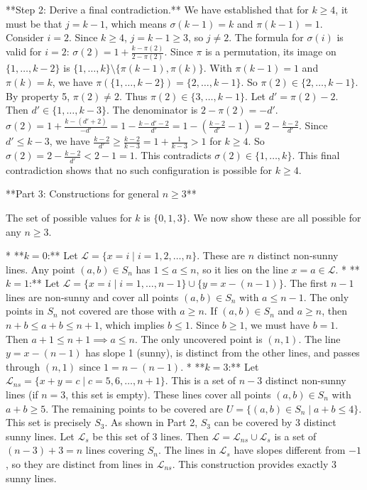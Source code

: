 \documentclass[12pt]{article}
\begin{document}
    **Step 2: Derive a final contradiction.**
    We have established that for $k \ge 4$, it must be that $j=k-1$, which means $\sigma(k-1)=k$ and $\pi(k-1)=1$.
    Consider $i=2$. Since $k \ge 4$, $j=k-1 \ge 3$, so $j \ne 2$. The formula for $\sigma(i)$ is valid for $i=2$:
    $\sigma(2) = 1 + \frac{k-\pi(2)}{2-\pi(2)}$.
    Since $\pi$ is a permutation, its image on $\{1, \dots, k-2\}$ is $\{1, \dots, k\} \setminus \{\pi(k-1), \pi(k)\}$. With $\pi(k-1)=1$ and $\pi(k)=k$, we have $\pi(\{1, \dots, k-2\}) = \{2, \dots, k-1\}$.
    So $\pi(2) \in \{2, \dots, k-1\}$. By property 5, $\pi(2) \ne 2$. Thus $\pi(2) \in \{3, \dots, k-1\}$.
    Let $d' = \pi(2)-2$. Then $d' \in \{1, \dots, k-3\}$.
    The denominator is $2-\pi(2) = -d'$.
    $\sigma(2) = 1 + \frac{k-(d'+2)}{-d'} = 1 - \frac{k-d'-2}{d'} = 1 - \left(\frac{k-2}{d'}-1\right) = 2 - \frac{k-2}{d'}$.
    Since $d' \le k-3$, we have $\frac{k-2}{d'} \ge \frac{k-2}{k-3} = 1+\frac{1}{k-3} > 1$ for $k \ge 4$.
    So $\sigma(2) = 2 - \frac{k-2}{d'} < 2-1=1$.
    This contradicts $\sigma(2) \in \{1, \dots, k\}$.
    This final contradiction shows that no such configuration is possible for $k \ge 4$.

**Part 3: Constructions for general $n \ge 3$**

The set of possible values for $k$ is $\{0, 1, 3\}$. We now show these are all possible for any $n \ge 3$.

*   **$k=0$:** Let $\mathcal{L} = \{x=i \mid i=1, 2, \dots, n\}$. These are $n$ distinct non-sunny lines. Any point $(a,b) \in S_n$ has $1 \le a \le n$, so it lies on the line $x=a \in \mathcal{L}$.
*   **$k=1$:** Let $\mathcal{L} = \{x=i \mid i=1, \dots, n-1\} \cup \{y=x-(n-1)\}$. The first $n-1$ lines are non-sunny and cover all points $(a,b) \in S_n$ with $a \le n-1$. The only points in $S_n$ not covered are those with $a \ge n$. If $(a,b) \in S_n$ and $a \ge n$, then $n+b \le a+b \le n+1$, which implies $b \le 1$. Since $b \ge 1$, we must have $b=1$. Then $a+1 \le n+1 \implies a \le n$. The only uncovered point is $(n,1)$. The line $y=x-(n-1)$ has slope 1 (sunny), is distinct from the other lines, and passes through $(n,1)$ since $1 = n-(n-1)$.
*   **$k=3$:** Let $\mathcal{L}_{ns} = \{x+y=c \mid c=5, 6, \dots, n+1\}$. This is a set of $n-3$ distinct non-sunny lines (if $n=3$, this set is empty). These lines cover all points $(a,b) \in S_n$ with $a+b \ge 5$. The remaining points to be covered are $U = \{(a,b) \in S_n \mid a+b \le 4\}$. This set is precisely $S_3$. As shown in Part 2, $S_3$ can be covered by 3 distinct sunny lines. Let $\mathcal{L}_s$ be this set of 3 lines. Then $\mathcal{L} = \mathcal{L}_{ns} \cup \mathcal{L}_s$ is a set of $(n-3)+3=n$ lines covering $S_n$. The lines in $\mathcal{L}_s$ have slopes different from $-1$, so they are distinct from lines in $\mathcal{L}_{ns}$. This construction provides exactly 3 sunny lines.
\end{document}
